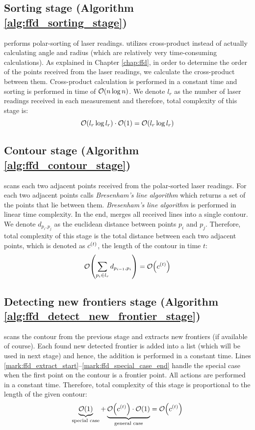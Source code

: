 \subsection{Sorting stage (Algorithm \ref{alg:ffd_sorting_stage})}
\FFD performs polar-sorting of laser readings. 
\FFD utilizes cross-product instead of actually
calculating angle and radius (which are relatively
very time-consuming calculations). As explained in Chapter
\ref{chap:ffd}, in order to determine the order of the points
received from the laser readings, we calculate the cross-product between
them. Cross-product calculation is performed in a constant time and
sorting is performed in time of $\mathcal{O}{\left(n\log{n}\right)}$. We denote $l_r$ as
the number of laser readings received in each measurement and therefore, total
complexity of this stage is:
 \begin{equation}\label{eq:sorting}
 	\mathcal{O}{\left(l_r\log{l_r}\right)} \cdot \mathcal{O}{\left(1\right)} = \mathcal{O}{\left(l_r \log{l_r}\right)}
 \end{equation}

\subsection{Contour stage (Algorithm \ref{alg:ffd_contour_stage})}
\FFD scans each two adjacent points received from the polar-sorted laser
readings. For each two adjacent points \FFD calls \emph{Bresenham's line algorithm} which returns
a set of the points that lie between them. \emph{Bresenham's line algorithm} is
performed in linear time complexity. In the end, \FFD merges all received lines
into a single contour. We denote $d_{p_i,p_j}$ as the euclidean distance
between points $p_i$ and $p_j$. Therefore, total complexity of this stage is
the total distance between each two adjacent points, which is denoted as
$c^{\left(t\right)}$, the length of the contour in time $t$:
\begin{equation}\label{eq:contour}
\mathcal{O}{\left(\sum_{p_i \in l_r}{d_{p_{i-1},p_i}}\right)} = \mathcal{O}{\left(c^{\left(t\right)}\right)}
\end{equation}

\subsection{Detecting new frontiers stage (Algorithm \ref{alg:ffd_detect_new_frontier_stage})}
\FFD scans the contour from the previous stage and extracts new frontiers (if
available of course).
Each found new detected frontier is added into a list (which will be used in
next stage) and hence, the addition is performed in a constant time. Lines
\ref{mark:ffd_extract_start}--\ref{mark:ffd_special_case_end} handle the
special case when the first point on the contour is a frontier point. All
actions are performed in a constant time. Therefore, total complexity of this
stage is proportional to the length of the given contour:
\begin{equation}\label{eq:detection}
	\underbrace{\mathcal{O}{\left(1\right)}}_{\textrm{special case}} +
	\underbrace{\mathcal{O}{\left(c^{\left(t\right)}\right)} \cdot \mathcal{O}{\left(1\right)}}_{\textrm{general case}} =
	\mathcal{O}{\left(c^{\left(t\right)}\right)}
\end{equation}

